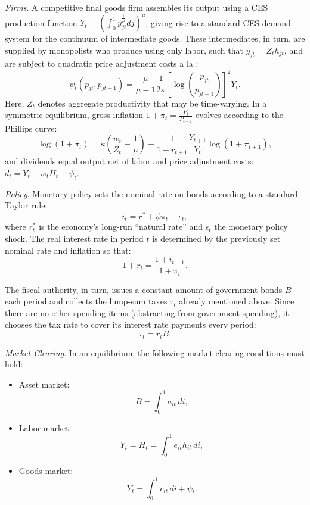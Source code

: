 \documentclass[a4paper,12pt]{article}%
\begin{document}
\emph{Firms}. A competitive final goods firm assembles its output using a CES production function \( Y_t = \left( \int_0^1 y_{j t}^{\frac{1}{\mu}} dj \right)^\mu \), giving rise to a standard CES demand system for the continuum of intermediate goods. These intermediates, in turn, are supplied by monopolists who produce using only labor, such that \( y_{jt} = Z_t h_{jt} \), and are subject to quadratic price adjustment costs a la \cite{Rotemberg:1982}:
\[
\psi_t\left(p_{j t}, p_{j t-1}\right) = \frac{\mu}{\mu-1} \frac{1}{2 \kappa} \left[ \log \left( \frac{p_{j t}}{p_{j t-1}} \right) \right]^2 Y_t.
\]
Here, \( Z_t \) denotes aggregate productivity that may be time-varying. In a symmetric equilibrium, gross inflation \( 1 + \pi_t = \frac{P_t}{P_{t-1}} \) evolves according to the Phillips curve:
\[
\log(1+\pi_t) = \kappa \left( \frac{w_t}{Z_t} - \frac{1}{\mu} \right) + \frac{1}{1 + r_{t+1}} \frac{Y_{t+1}}{Y_t} \log(1 + \pi_{t+1}),
\]
and dividends equal output net of labor and price adjustment costs: \( d_t = Y_t - w_t H_t - \psi_t \).

\emph{Policy}. Monetary policy sets the nominal rate on bonds according to a standard Taylor rule: 
\[
i_t = r^* + \phi \pi_t+\epsilon_t,
\]
where \( r^*_t \) is the economy's long-run ``natural rate'' and $\epsilon_t$ the monetary policy shock. The real interest rate in period \( t \) is determined by the previously set nominal rate and inflation so that:
\[
1 + r_t = \frac{1 + i_{t-1}}{1 + \pi_t}.
\]

The fiscal authority, in turn, issues a constant amount of government bonds \( B \) each period and collects the lump-sum taxes \( \tau_t \) already mentioned above. Since there are no other spending items (abstracting from government spending), it chooses the tax rate to cover its interest rate payments every period:
\[
\tau_t = r_t B.
\]

\emph{Market Clearing}. In an equilibrium, the following market clearing conditions must hold:
\begin{itemize}
    \item Asset market:
    \[
    B = \int_0^1 a_{it} \, di,
    \]

    \item Labor market:
    \[
    Y_t = H_t = \int_0^1 e_{it} h_{it} \, di,
    \]

	    \item Goods market:
	    \[
	    Y_t = \int_0^1 c_{it} \, di + \psi_t.
	    \]
	\end{itemize}
\end{document}
